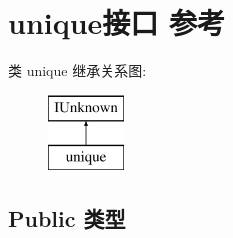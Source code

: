 \hypertarget{interfaceunique}{}\section{unique接口 参考}
\label{interfaceunique}
类 unique 继承关系图\+:\begin{figure}[H]
\begin{center}
\leavevmode
\includegraphics[height=2.000000cm]{interfaceunique}
\end{center}
\end{figure}
\subsection*{Public 类型}
